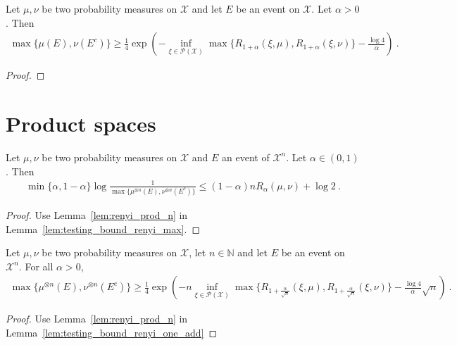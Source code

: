 \begin{lemma}
  \label{lem:testing_bound_renyi_one_add}
  Let $\mu, \nu$ be two probability measures on $\mathcal X$ and let $E$ be an event on $\mathcal X$. Let $\alpha > 0$. Then
  \begin{align*}
  \max\{\mu(E), \nu(E^c)\} \ge \frac{1}{4}\exp\left( - \inf_{\xi \in \mathcal P(\mathcal X)}\max\{R_{1+\alpha}(\xi, \mu), R_{1+\alpha}(\xi, \nu)\} - \frac{\log 4}{\alpha}\right) \: .
  \end{align*}
\end{lemma}

\begin{proof}
\end{proof}


\section{Product spaces}

\begin{corollary}
  \label{cor:testing_bound_renyi_n}
  Let $\mu, \nu$ be two probability measures on $\mathcal X$ and $E$ an event of $\mathcal X^n$. Let $\alpha \in (0,1)$. Then
  \begin{align*}
  \min\{\alpha, 1 - \alpha\} \log\frac{1}{\max\{\mu^{\otimes n}(E), \nu^{\otimes n}(E^c)\}} \le (1 - \alpha) n R_{\alpha}(\mu, \nu)  + \log 2 \: .
  \end{align*}
\end{corollary}

\begin{proof}
Use Lemma~\ref{lem:renyi_prod_n} in Lemma~\ref{lem:testing_bound_renyi_max}.
\end{proof}

\begin{lemma}
  \label{lem:testing_bound_renyi_one_add_n}
  Let $\mu, \nu$ be two probability measures on $\mathcal X$, let $n \in \mathbb{N}$ and let $E$ be an event on $\mathcal X^n$. For all $\alpha > 0$,
  \begin{align*}
  \max\{\mu^{\otimes n}(E), \nu^{\otimes n}(E^c)\} \ge \frac{1}{4}\exp\left( - n \inf_{\xi \in \mathcal P(\mathcal X)}\max\{R_{1+\frac{\alpha}{\sqrt{n}}}(\xi, \mu), R_{1+\frac{\alpha}{\sqrt{n}}}(\xi, \nu)\} - \frac{\log 4}{\alpha}\sqrt{n}\right) \: .
  \end{align*}
\end{lemma}

\begin{proof}
Use Lemma~\ref{lem:renyi_prod_n} in Lemma~\ref{lem:testing_bound_renyi_one_add}
\end{proof}

